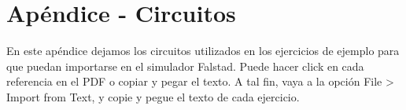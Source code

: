 \documentclass{article}
\begin{document}
\section*{Apéndice - Circuitos}
	\begin{tcolorbox}[enhanced,attach boxed title to top center={yshift=-3mm,yshifttext=-1mm},
		colback=black!5!white,colframe=white!75!black,colbacktitle=red!80!black,
		title= Simulador Falstad , fonttitle=\bfseries,
		boxed title style={size=small,colframe=white,colback=black} ]
		En este apéndice dejamos los circuitos utilizados en los ejercicios de ejemplo para que puedan importarse en el simulador Falstad. Puede hacer click en cada referencia en el PDF o copiar y pegar el texto. A tal fin, vaya a la opción File > Import from Text, y copie y pegue el texto de cada ejercicio.
	\end{tcolorbox}
\end{document}
